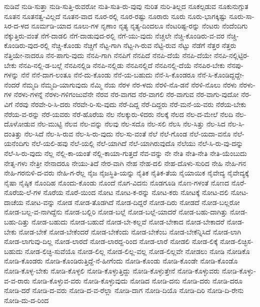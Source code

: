 {ನುಡಿವೆ
ನುಡಿ-ಸುತ್ತಾ
ನುಡಿ-ಸುತ್ತಿ-ರುವರೋ
ನುತಿ-ಸುತಿ-ರು-ವುವು
ನುರಿತ
ನುರಿ-ತಿಲ್ಲದ
ನೂಕಲ್ಪಡುವ
ನೂಕುನುಗ್ಗುತ
ನೂತನ
ನೂತನತ್ವ-ವಿಲ್ಲದೆ
ನೂತನ-ವಾದ
ನೂರ-ರಲ್ಲಿ
ನೂರ-ರಷ್ಟು
ನೂರಾರು
ನೂರು
ನೂರು-ಭಾಗಕ್ಕಿಷ್ಟು
ನೂರು-ಸಾ-ಸಿರ-ದ-ಳದ
ನೂರ್ಮಡಿ-ಯಾದ
ನೂಲು-ಗಳ
ನೃಣಾಂ
ನೃತ್ಯ
ನೃತ್ಯ-ದಿಂದಲೂ
ನೆಂಟರಿಷ್ಟ-ರನ್ನು
ನೆಂಟರು
ನೆಂದೆಂದಿಗು
ನೆಕ್ಕುತ್ತಿರು-ವಂತೆ
ನೆಗೆ-ದಾಡಲಿ
ನೆಗೆ-ದಾಡುವುದ-ರಲ್ಲಿ
ನೆಗೆ-ಯು-ವುದು
ನೆಚ್ಚಲೇ
ನೆಚ್ಚಿ-ಕೊಂಡಿರು-ವ-ವರ
ನೆಚ್ಚಿ-ಕೊಂಡಿರು-ವುದ-ರಲ್ಲಿ
ನೆಚ್ಚಿ-ಕೊಂಡು
ನೆಚ್ಚಿಗೆ
ನೆಟ್ಟ-ಗಾಗಿ
ನೆಟ್ಟ-ಗಿ-ರುವ
ನೆಟ್ಟಿ-ರುವ
ನೆಟ್ಟು
ನೆಡೆಗೆ
ನೆತ್ತರ
ನೆತ್ತರು
ನೆತ್ತಿಯೇ-ನಾದರೂ
ನೆನ-ಪಾಗು-ವುದು
ನೆನಪಿ-ಗಾಗಿ
ನೆನಪಿಗೆ
ನೆನಪಿದೆ
ನೆನಪಿ-ದೆಯೆ
ನೆನಪಿ-ದೆಯೇ
ನೆನಪಿ-ನಲ್ಲಿಟ್ಟಿರ-ಬೇಕು
ನೆನಪಿ-ನಲ್ಲಿ-ಡ-ಬಲ್ಲೆ
ನೆನಪಿನಲ್ಲಿಡಿ
ನೆನಪಿ-ನಲ್ಲಿಡು
ನೆನಪಿನಲ್ಲಿದೆ
ನೆನಪಿನಲ್ಲಿ-ದೆಯೆ
ನೆನಪಿರ-ಬೇಕು
ನೆನಪು-ಗಳನ್ನು
ನೆನೆ
ನೆನೆ-ದಾಗ-ಲಂತೂ
ನೆನೆ-ದು-ಕೊಂಡು
ನೆನೆ-ಯ-ಬಹುದು
ನೆನೆ-ಸಿ-ಕೊಂಡರೂ
ನೆನೆ-ಸಿ-ಕೊಂಡಿದ್ದದ್ದೇ-ನೆಂದರೆ
ನೆಮ್ಮದಿ
ನೆಮ್ಮದಿ-ಯಾಗುವುದು
ನೆಮ್ಮಿ
ನೆಯ
ನೆರಳ
ನೆರ-ಳದು
ನೆರಳಿ-ನೊ-ಡನೆ
ನೆರಳಿ-ನೊಲು
ನೆರಳು
ನೆರಳು-ಗಳ
ನೆರಳು-ಗಳನ್ನೆ
ನೆರಳು-ಗಳಿಗಂಜುವೆನೇ
ನೆರವ
ನೆರ-ವಾಗದ
ನೆರ-ವಾಗಲಿ
ನೆರ-ವಾಗುವ
ನೆರ-ವಾಗು-ವುದೋ
ನೆರ-ವಿಗೆ
ನೆರವು
ನೆರವೇ-ರಿ-ಸಿ-ದರು
ನೆರವೇ-ರಿ-ಸು-ವುದು
ನೆರೆ-ದಿದ್ದ
ನೆರೆ-ದಿದ್ದರು
ನೆರೆ-ಮನೆ-ಯ-ವರು
ನೆರೆಯ-ಬೇಕು
ನೆರೆಯ-ವ-ರನ್ನು
ನೆರೆ-ಯವರು
ನೆರೆ-ಹೊರೆಯ
ನೆಲ
ನೆಲಕ್ಕುರು-ಳಿದರು
ನೆಲಕ್ಕೆ
ನೆಲದ
ನೆಲ-ದ-ಮೇಲೆ
ನೆಲದಿ
ನೆಲ-ದೊಳೋಡುವ
ನೆಲ-ಮುಟ್ಟಿ
ನೆಲವ
ನೆಲ-ವನ್ನು
ನೆಲವು
ನೆಲ-ಸದೊ
ನೆಲ-ಸಲಿ
ನೆಲಸಿ
ನೆಲ-ಸಿತ್ತು
ನೆಲ-ಸಿದ
ನೆಲ-ಸಿ-ದಂತಿತ್ತು
ನೆಲ-ಸಿದೆ
ನೆಲ-ಸಿ-ರುವ
ನೆಲ-ಸಿ-ರು-ವುದು
ನೆಲ-ಸು-ವಂತೆ
ನೆಲೆ
ನೆಲೆ-ಗೊಂಡ
ನೆಲೆ-ಯದಾ-ವನೊ
ನೆಲೆ-ಯನೆಂದಿಗು
ನೆಲೆ-ಯಲಿ-ಹವು
ನೆಲೆ-ಯಲ್ಲಿ
ನೆಲೆ-ಯಾಗಿದೆ
ನೆಲೆ-ಯಾಗಿರುವುದೊ
ನೆಲೆಯು
ನೆಲೆ-ಸಿ-ರು-ವು-ದನ್ನು
ನೆಲೆ-ಸಿ-ರು-ವುದು
ನೆಲ್ಲ
ನೆಲ್ಲಿ-ಕಾ-ಯಂತೆ
ನೆಲ್ಲಿ-ಕಾಯಾ-ಗುತ್ತದೆ
ನೆವ-ವನ್ನು
ನೇ
ನೇತಿ
ನೇತಿ-ನೇತಿ
ನೇತಿ-ಯೆಂಬುದು
ನೇತೃ-ಗಳು
ನೇತ್ರೀ
ನೇನಾದರೂ
ನೇಯು-ತಿದೆ
ನೇರ-ವಾಗಿ
ನೇಹ
ನೇಹ-ದಲಿ
ನೇಹ-ದೊಳು-ಸುರಿದ
ನೇಹಿ
ನೇಹಿ-ಗನ
ನೇಹಿ-ಗರನುಳಿ-ದ-ವರು
ನೇಹಿ-ಗ-ರೆಲ್ಲ
ನೈಜ
ನೈಜಸ್ಥಿತಿ-ಯನ್ನು
ನೈತಿಕ
ನೈತಿಕ-ತೆಯ
ನೈಯಾಯಿಕ
ನೈವೇದ್ಯ
ನೈವೇದ್ಯಕ್ಕೆ
ನೈಷಾ
ನೈಷ್ಠಿಕ
ನೊಂದಿಹ
ನೊಂದು-ಕೊಂಡು
ನೊಂದೆ
ನೊಗ-ವಿದನು
ನೊಡಗೂಡಿ
ನೊಣ-ಗಳಂತೆ
ನೊಣದ
ನೊರೆ-ನೊರೆಯ-ಲೆ-ಗಳ
ನೊರೆಯ
ನೊರೆ-ಯಿಂದ
ನೋಟ
ನೋಟ-ಕ-ರನ್ನು
ನೋಟ-ಕರು
ನೋಟಕ್ಕೆ
ನೋಟ-ದಲಿ
ನೋಟ-ದಾಚೆಯ
ನೋಟ-ವನ್ನು
ನೋಡ
ನೋಡ-ತೊಡಗಿದೆ
ನೋಡ-ದಿದ್ದರೆ
ನೋಡ-ದಿರು
ನೋಡದೆ
ನೋಡ-ಬಲ್ಲರೋ
ನೋಡ-ಬಲ್ಲ-ವ-ನಾಗಿದ್ದೆನು
ನೋಡ-ಬಲ್ಲಿರಿ
ನೋಡ-ಬಲ್ಲೆ
ನೋಡ-ಬಲ್ಲೆ-ಯಾದರೆ
ನೋಡ-ಬಹು-ದಾಗಿತ್ತು
ನೋಡ-ಬಹು-ದಿತ್ತು
ನೋಡ-ಬಹುದು
ನೋಡ-ಬಹುದೆ
ನೋಡ-ಬೇ-ಕಲ್ಲವೆ
ನೋಡ-ಬೇಕಾದ
ನೋಡ-ಬೇಕಾದರೆ
ನೋಡ-ಬೇಕು
ನೋಡ-ಬೇಕೆ
ನೋಡ-ಬೇಕೆಂದರೆ
ನೋಡ-ಬೇಕೆಂದು
ನೋಡ-ಬೇಕೆಂಬ
ನೋಡ-ಬೇಕೆನ್ನಿಸಿದೆ
ನೋಡ-ಲಾಗಿ
ನೋಡ-ಲಾಗುವು-ದಿಲ್ಲ
ನೋಡ-ಲಾರದೆ
ನೋಡ-ಲಾರದ್ದ-ರಿಂದ
ನೋಡ-ಲಾರೆ
ನೋಡಲಿ
ನೋಡ-ಲಿಕ್ಕೆ
ನೋಡ-ಲಿಚ್ಛಿಸ-ಬಹುದು
ನೋಡ-ಲಿಚ್ಛಿ-ಸುವೆಯೊ
ನೋಡ-ಲಿಲ್ಲ
ನೋಡ-ಲಿಲ್ಲ-ವಲ್ಲ
ನೋಡ-ಲಿಲ್ಲವೇ
ನೋಡಲು
ನೋಡಿ
ನೋಡಿಕೊ
ನೋಡಿ-ಕೊಂಡರು
ನೋಡಿ-ಕೊಂಡಿರುತ್ತಿದ್ದೆ-ನೆ-ಹೀಗೆಂದು
ನೋಡಿ-ಕೊಂಡು
ನೋಡಿ-ಕೊಂಡೇ
ನೋಡಿ-ಕೊಂಡೊ
ನೋಡಿ-ಕೊಳ್ಳ-ಬೇಕು
ನೋಡಿ-ಕೊಳ್ಳಲಿ
ನೋಡಿ-ಕೊಳ್ಳುತ್ತಿದ್ದು
ನೋಡಿ-ಕೊಳ್ಳುತ್ತೇನೆ
ನೋಡಿ-ಕೊಳ್ಳುವರು
ನೋಡಿ-ಕೊಳ್ಳು-ವ-ವ-ರಾರು
ನೋಡಿ-ಕೊಳ್ಳುವ-ವರು
ನೋಡಿ-ಕೊಳ್ಳುವುದು
ನೋಡಿದ
ನೋಡಿ-ದನು
ನೋಡಿ-ದರು
ನೋಡಿ-ದರೂ
ನೋಡಿ-ದರೆ
ನೋಡಿ-ದ-ವರು
ನೋಡಿ-ದ-ವ-ರೆಲ್ಲಾ
ನೋಡಿ-ದಾಗ
ನೋಡಿ-ದಿಯೊ
ನೋಡಿ-ದಿರಿ
ನೋಡಿ-ದಿ-ರೇನು
ನೋಡಿ-ದು-ದ-ರಿಂದ
}
